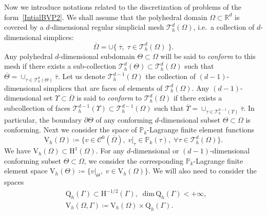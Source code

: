 \documentclass[a4paper,11pt]{article}
\newcommand{\RR}{\mathbb{R}}
\newcommand{\mrm}{\mathrm}
\newcommand{\mH}{\mathrm{H}}
\newcommand{\mQ}{\mathrm{Q}}
\newcommand{\Vh}{\mathrm{V}_{h}}
\newcommand{\Qh}{\mathrm{Q}_{h}}
\begin{document}
Now we introduce notations related to the discretization of problems
of the form~\eqref{IntialBVP2}. We shall assume that the polyhedral
domain $\Omega\subset \RR^d$ is covered by a $d$-dimensional regular
simplicial mesh $\mathcal{T}_h^{d}(\Omega)$, i.e.~a
collection of $d$-dimensional simplices:
\begin{equation*}
  \overline{\Omega} = \cup\{\;\overline{\tau},\; \tau\in
  \mathcal{T}_h^{d}(\Omega)\;\}.
\end{equation*}
Any polyhedral $d$-dimensional subdomain $\Theta\subset \Omega$ will
be said to \emph{conform} to this mesh if there exists a
sub-collection $\mathcal{T}_h^{d}(\Theta)\subset
\mathcal{T}_h^{d}(\Omega)$ such that $\overline{\Theta} = \cup_{\tau\in
  \mathcal{T}_h^{d}(\Theta)}\overline{\tau}$. Let us denote
$\mathcal{T}_h^{d-1}(\Omega)$ the collection of $(d-1)$-dimensional
simplices that are faces of elements of $\mathcal{T}_h^{d}(\Omega)$.
Any $(d-1)$-dimensional set $\Upsilon\subset \overline{\Omega}$ is
said to \emph{conform} to $\mathcal{T}_h^{d}(\Omega)$ if there exists a
subcollection of faces $\mathcal{T}_h^{d-1}(\Upsilon)\subset
\mathcal{T}_h^{d-1}(\Omega)$ such that $\overline{\Upsilon} =
\cup_{\tau\in \mathcal{T}_h^{d-1}(\Upsilon)}\overline{\tau}$. In
particular, the boundary $\partial\Theta$ of any conforming
$d$-dimensional subset $\Theta\subset \Omega$ is conforming. Next we
consider the space of $\mathbb{P}_k$-Lagrange finite element functions
\begin{equation*}
  \Vh(\Omega) \coloneq \{ v\in \mathscr{C}^{0}(\overline{\Omega}),\;
  v\vert_{\tau}\in \mathbb{P}_k(\tau),
  \;\forall\tau\in\mathcal{T}_h^d(\Omega)\}.
\end{equation*}
We have $\Vh(\Omega)\subset \mH^{1}(\Omega)$. For any
$d$-dimensional or $(d-1)$-dimensional conforming subset
$\Theta\subset \Omega$, we consider the corresponding
$\mathbb{P}_k$-Lagrange finite element space $\Vh(\Theta) \coloneq \{
v\vert_{\Theta},\; v\in \Vh(\Omega)\}$. We will also need to consider
the spaces
\begin{equation*}
  \begin{aligned}
    & \Qh(\Gamma)\subset \mH^{-1/2}(\Gamma),\;\; \mrm{dim}\, \mQ_h(\Gamma) <+\infty,\\
    & \Vh(\Omega,\Gamma)\coloneq \Vh(\Omega)\times\Qh(\Gamma).
  \end{aligned}
\end{equation*}
\end{document}
